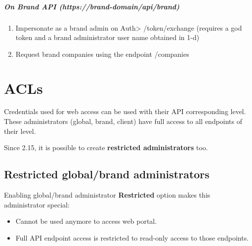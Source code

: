 \documentclass[letterpaper,10pt,english]{sphinxmanual}
\begin{document}
\paragraph{On Brand API (https://brand-domain/api/brand)}
\begin{enumerate}
\item {} 
Impersonate as a brand admin on Auth\textgreater{} /token/exchange (requires a god token and a brand administrator user name obtained in 1-d)

\item {} 
Request brand companies using the endpoint /companies

\end{enumerate}


\chapter{ACLs}
\label{api_rest/acls:acls}\label{api_rest/acls::doc}
Credentials used for web access can be used with their API corresponding level. These administrators (global, brand, client)
have full access to all endpoints of their level.

Since 2.15, it is possible to create \textbf{restricted administrators} too.


\section{Restricted global/brand administrators}
\label{api_rest/acls:restricted-global-brand-administrators}
Enabling global/brand administrator \textbf{Restricted} option makes this administrator special:
\begin{itemize}
\item {} 
Cannot be used anymore to access web portal.

\item {} 
Full API endpoint access is restricted to read-only access to those endpoints.

\end{itemize}
\end{document}
